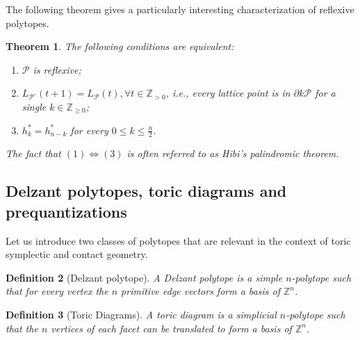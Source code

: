 \documentclass[a4paper,11pt,reqno]{amsart}
\newtheorem{theorem}{Theorem}[section]
\newtheorem{definition}[theorem]{Definition}
\begin{document}
The following theorem gives a particularly interesting characterization of reflexive polytopes.
\begin{theorem}\label{thm:reflexive}
The following conditions are equivalent:
\begin{enumerate}
\item $\mathcal{P}$ is reflexive;
\item $L_{\mathcal{P}^\circ} (t+1) = L_{\mathcal{P}} (t), \forall t\in \mathbb{Z}_{> 0}$, i.e., every lattice point 
is in $\partial k \mathcal{P}$ for a single $k \in \mathbb{Z}_{\geq 0}$;
\item $h_k^*=h^*_{n-k}$ for every $0 \leq k \leq \frac{n}{2}$.
\end{enumerate}
The fact that $(1) \Leftrightarrow (3)$ is often referred to as Hibi's palindromic theorem.
\end{theorem}

\subsection{Delzant polytopes, toric diagrams and prequantizations}
\label{ssec: Delzant}

Let us introduce two classes of polytopes that are relevant in the context of toric symplectic and contact geometry.
\begin{definition}[Delzant polytope]
A Delzant polytope is a simple $n$-polytope such that for every vertex the $n$ primitive edge vectors form a basis of 
$\mathbb{Z}^n$.
\end{definition}
\begin{definition}[Toric Diagrams] \label{def:diagram}
A toric diagram is a simplicial $n$-polytope such that the $n$ vertices of each facet can be translated to form a basis of 
$\mathbb{Z}^n$.
\end{definition}
\end{document}
